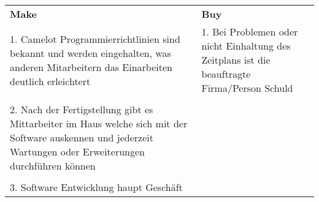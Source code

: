\begin{tabu}{p{0.47\textwidth}p{0.46\textwidth}}
\rowfont{\bfseries\leavevmode\color{headingfont}}\textbf{Make} & \textbf{Buy} \\
1. Camelot Programmierrichtlinien sind bekannt und werden eingehalten, was anderen Mitarbeitern das Einarbeiten deutlich erleichtert & 1. Bei Problemen oder nicht Einhaltung des Zeitplans ist die beauftragte Firma/Person Schuld \\
\\[-1em]
2. Nach der Fertigstellung gibt es Mittarbeiter im Haus welche sich mit der Software auskennen und jederzeit Wartungen oder Erweiterungen durchführen können & \\
\\[-1em]
3. Software Entwicklung haupt Geschäft & \\
\end{tabu}